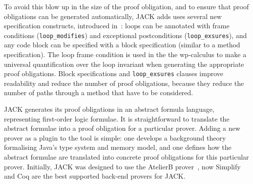 
To avoid this blow up in the size of the proof obligation, and to
ensure that proof obligations can be generated automatically, JACK
adds uses several new specification constructs, introduced
in~\cite{BurdyRL03}: loops can be annotated with frame conditions
(\texttt{loop\_modifies}) and exceptional postconditions
(\texttt{loop\_exsures}), and any code block can be specified with a
block specification (similar to a method specification). The loop
frame condition is used in the the wp-calculus to make a universal
quantification over the loop invariant when generating the appropriate
proof obligations. Block specifications and
\texttt{loop\_exsures} clauses improve readability and reduce the
number of proof obligations, because they reduce the number of paths
through a method that have to be considered.


JACK generates its proof obligations in an abstract formula language,
representing first-order logic formulae. It is straightforward to
translate the abstract formulae into a proof obligation for a
particular prover. Adding a new prover as a plugin to the tool is
simple: one develops a background theory formalising Java's type
system and memory model, and one defines how the abstract formulae are
translated into concrete proof obligations for this particular
prover. Initially, JACK was designed to use the AtelierB
prover~\cite{Abrial96}, now Simplify and Coq are the best
supported back-end provers for JACK.




